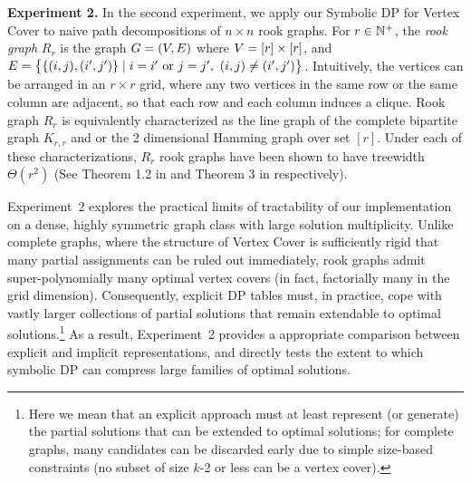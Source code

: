 \textbf{Experiment 2.}
In the second experiment, we apply our Symbolic DP for {\sc Vertex Cover} to naive path decompositions of $n \times n$ rook graphs. 
For $r \in \mathbb{N}^+$, the \emph{rook graph} $R_r$ is the graph
$G = (V,E)$ where $V = [r] \times [r]$, and $E = \bigl\{\{(i,j),(i',j')\} \mid i=i' \text{ or } j=j',\ (i,j) \neq (i',j') \bigr\}$.
Intuitively, the vertices can be arranged in an $r \times r$ grid, where any two vertices in the same row or the same column are adjacent, so that each row and each column induces a clique. Rook graph $R_r$ is equivalently characterized as the line graph of the complete bipartite graph $K_{r,r}$ and or the 2 dimensional Hamming graph over set  $[r]$. Under each of these characterizations, $R_r$ rook graphs have been shown to have treewidth $\Theta(r^2)$ (See Theorem 1.2 in \cite{HarveyTreewidth2014} and Theorem 3 in \cite{SUNILCHANDRAN} respectively).

Experiment~2 explores the practical limits of tractability of our implementation
on a dense, highly symmetric graph class with large solution
multiplicity. Unlike complete graphs, where the structure of {\sc Vertex Cover}
is sufficiently rigid that many partial assignments can be ruled out
immediately, rook graphs admit super-polynomially many optimal vertex covers (in
fact, factorially many in the grid dimension). Consequently, explicit DP tables
must, in practice, cope with vastly larger collections of partial solutions that
remain extendable to optimal solutions.\footnote{Here we mean that an explicit
approach must at least represent (or generate) the partial solutions that can be
extended to optimal solutions; for complete graphs, many candidates can be
discarded early due to simple size-based constraints (no subset of size $k$-2 or less can be a vertex cover).} As a result,
Experiment~2 provides a appropriate comparison between explicit and implicit
representations, and directly tests the extent to which symbolic DP can compress
large families of optimal solutions.

